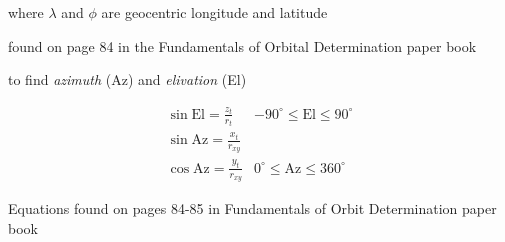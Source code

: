 where $\lambda$ and $\phi$ are geocentric longitude and latitude

found on page 84 in the Fundamentals of Orbital Determination paper book

to find \emph{azimuth} (Az) and \emph{elivation} (El)

\[ \begin{array}{ll}
\sin\mbox{El}=\frac{z_{t}}{r_{t}} & -90^{\circ} \leq \mbox{El} \leq 90^{\circ} \\
\sin\mbox{Az}=\frac{x_{t}}{r_{xy}} & \\
\cos\mbox{Az}=\frac{y_{t}}{r_{xy}} & 0^{\circ} \leq \mbox{Az} \leq 360^{\circ}
\end{array} \]

Equations found on pages 84-85 in  Fundamentals of Orbit Determination paper book

\putbib[gpstk]
%
